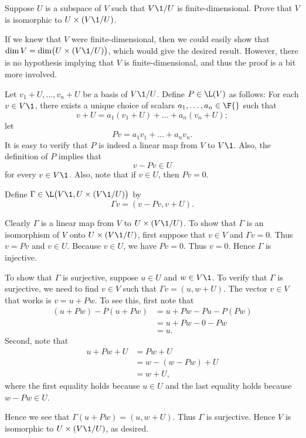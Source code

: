 \exercise
Suppose $U$ is a subspace of $V$ such that $V\1/U$ is finite-dimensional. Prove that $V$ is isomorphic to
$U \times (V\1/U)$.

\begin{Solution}
If we knew that $V$ were finite-dimensional, then we could easily show that
$\dim V = \dim \bigr( U \times (V\1/U) \bigl)$, which would give the desired result. However, there is no hypothesis implying that $V$ is finite-dimensional, and thus the proof is a bit more involved.

Let $v_1 + U, \dots, v_n + U$ be a basis of $V\1/U$. Define $P \in \L(V)$ as follows: For each $v \in V\1$, there exists a unique choice of scalars $a_1, \dots, a_n \in \F{}$ such that
\[
v + U = a_1(v_1 + U) + \dots + a_n (v_n + U);
\]
let
\[
Pv = a_1 v_1 + \dots + a_n v_n.
\]
It is easy to verify that $P$ is indeed a linear map from $V$ to $V\1$. Also, the definition of $P$ implies that
\[
v - Pv \in U
\]
for every $v \in V\1$. Also, note that if $v \in U$, then $Pv = 0$.

Define $\Gamma \in \L\bigl(V\1,  U \times (V\1/U) \bigr)$ by
\[
\Gamma v = (v - Pv, v + U).
\]

Clearly $\Gamma$ is a linear map from $V$ to $ U \times (V\1/U)$. To show that $\Gamma$ is an isomorphism of $V$ onto $ U \times (V\1/U)$, first suppose that $v \in V$ and $\Gamma v = 0$. Thus $v = Pv$ and $v \in U$. Because $v \in U$, we have $Pv = 0$. Thus $v = 0$. Hence $\Gamma$ is injective.

To show that $\Gamma$ is surjective, suppose $u \in U$ and $w \in V\1$. To verify that $\Gamma$ is surjective, we need to find $v \in V$ such that $\Gamma v = (u, w + U)$. The vector $v \in V$ that works is $v = u + Pw$. To see this, first note that
\begin{align*}
(u + Pw) - P(u + Pw) &= u + Pw - Pu -P(Pw) \\
&= u + Pw -0 - Pw \\
&= u.
\end{align*}
Second, note that
\begin{align*}
u + Pw + U &= Pw + U \\
&= w - (w - Pw) + U \\
&= w + U,
\end{align*}
where the first equality holds because $u \in U$ and the last equality holds because $w - Pw \in U$.

Hence we see that $\Gamma(u + Pw) = (u, w + U)$. Thus $\Gamma$ is surjective. Hence $V$ is isomorphic to $U \times (V\1/U)$, as desired.
\end{Solution}

